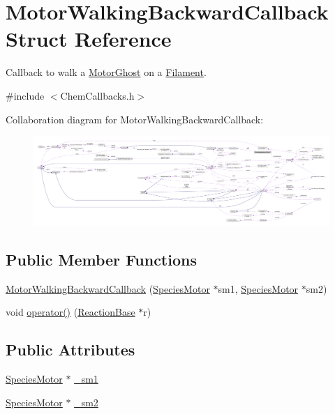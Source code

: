 \hypertarget{structMotorWalkingBackwardCallback}{\section{Motor\+Walking\+Backward\+Callback Struct Reference}
\label{structMotorWalkingBackwardCallback}
}


Callback to walk a \hyperlink{classMotorGhost}{Motor\+Ghost} on a \hyperlink{classFilament}{Filament}.  




{\ttfamily \#include $<$Chem\+Callbacks.\+h$>$}



Collaboration diagram for Motor\+Walking\+Backward\+Callback\+:
\nopagebreak
\begin{figure}[H]
\begin{center}
\leavevmode
\includegraphics[width=350pt]{structMotorWalkingBackwardCallback__coll__graph}
\end{center}
\end{figure}
\subsection*{Public Member Functions}
\begin{DoxyCompactItemize}
\item 
\hyperlink{structMotorWalkingBackwardCallback_a3e45e7643e7ca83c54937a05f77159bd}{Motor\+Walking\+Backward\+Callback} (\hyperlink{classSpeciesMotor}{Species\+Motor} $\ast$sm1, \hyperlink{classSpeciesMotor}{Species\+Motor} $\ast$sm2)
\item 
void \hyperlink{structMotorWalkingBackwardCallback_a02e519a23fde96e9cc408bef3da2efb0}{operator()} (\hyperlink{classReactionBase}{Reaction\+Base} $\ast$r)
\end{DoxyCompactItemize}
\subsection*{Public Attributes}
\begin{DoxyCompactItemize}
\item 
\hyperlink{classSpeciesMotor}{Species\+Motor} $\ast$ \hyperlink{structMotorWalkingBackwardCallback_a319a8ea51cf864c8dddeafeb6356af34}{\+\_\+sm1}
\item 
\hyperlink{classSpeciesMotor}{Species\+Motor} $\ast$ \hyperlink{structMotorWalkingBackwardCallback_ac19bf18556502e7eda1b89d28b36236e}{\+\_\+sm2}
\end{DoxyCompactItemize}


